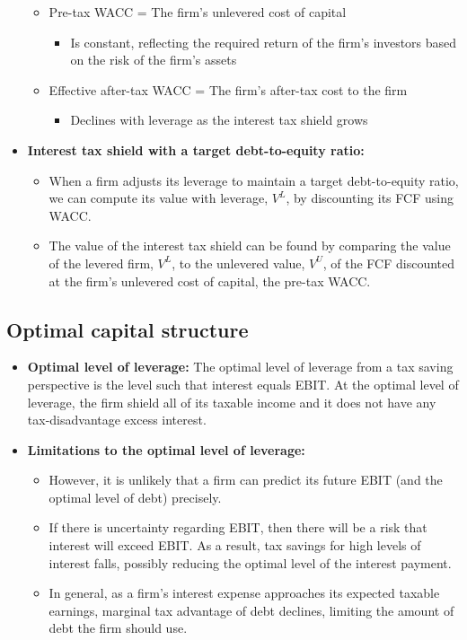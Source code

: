 \documentclass[ieeetran]{article}
\begin{document}
\begin{itemize}
\begin{itemize}
  \item Pre-tax WACC = The firm's unlevered cost of capital
	  \begin{itemize}
	    \item Is constant, reflecting the required return of the firm's investors based on the risk of the firm's assets
	  \end{itemize}
\item Effective after-tax WACC = The firm's after-tax cost to the firm
	\begin{itemize}
	  \item Declines with leverage as the interest tax shield grows
	\end{itemize}
\end{itemize}

\item \textbf{Interest tax shield with a target debt-to-equity ratio:}
	\begin{itemize}
	  \item When a firm adjusts its leverage to maintain a target debt-to-equity ratio, we can compute its value with leverage, $V^L$, by discounting its FCF using WACC.
	\item The value of the interest tax shield can be found by comparing the value of the levered firm, $V^L$, to the unlevered value, $V^U$, of the FCF discounted at the firm's unlevered cost of capital, the pre-tax WACC.
	\end{itemize}
\end{itemize}

\subsection{Optimal capital structure} %
\label{sub:optimal_level_of_structure}

\begin{itemize}
  \item \textbf{Optimal level of leverage:} The optimal level of leverage from a tax saving perspective is the level such that interest equals EBIT. At the optimal level of leverage, the firm shield all of its taxable income and it does not have any tax-disadvantage excess interest.

\item \textbf{Limitations to the optimal level of leverage:}
	\begin{itemize}
	  \item However, it is unlikely that a firm can predict its future EBIT (and the optimal level of debt) precisely.
	\item If there is uncertainty regarding EBIT, then there will be a risk that interest will exceed EBIT. As a result, tax savings for high levels of interest falls, possibly reducing the optimal level of the interest payment.
	\item In general, as a firm's interest expense approaches its expected taxable earnings, marginal tax advantage of debt declines, limiting the amount of debt the firm should use.
	\end{itemize}
\end{itemize}
\end{document}
